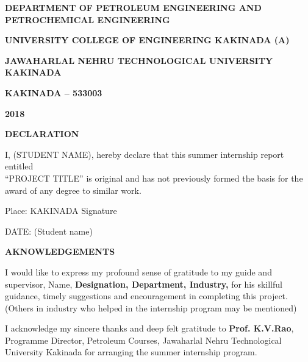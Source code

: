 \documentclass[11pt,a4paper]{article}
\begin{document}
\begin{titlepage}
\begin{center}
\vspace{1em}

\doublespacing

\large \textbf{DEPARTMENT OF PETROLEUM ENGINEERING AND \\ 
PETROCHEMICAL ENGINEERING}

\large \textbf{UNIVERSITY COLLEGE OF ENGINEERING KAKINADA (A)}

\large \textbf{JAWAHARLAL NEHRU TECHNOLOGICAL UNIVERSITY KAKINADA}

\large \textbf{KAKINADA – 533003}

\large \textbf{2018}

\end{center}
\end{titlepage}

\newpage

\begin{center}
\textbf{DECLARATION}
\end{center}

\vspace{4em}

I, (STUDENT NAME), hereby declare that this summer internship report entitled \\ “PROJECT TITLE” is original and has not previously formed the basis for the award of any degree to similar work.


\vspace{5em}

Place: KAKINADA  Signature

\vspace{1em}

DATE:                        {(Student name)}


\newpage

\begin{center}
\textbf{AKNOWLEDGEMENTS}
\end{center}


\vspace{1em}

I would like to express my profound sense of gratitude to my guide and supervisor, Name, \textbf{Designation, Department, Industry,} for his skillful guidance, timely suggestions and encouragement in completing this project. (Others in industry who helped in the internship program may be mentioned)

\vspace{1em}

I acknowledge my sincere thanks and deep felt gratitude to \textbf{Prof. K.V.Rao}, Programme Director, Petroleum Courses, Jawaharlal Nehru Technological University Kakinada for arranging the summer internship program.
\end{document}
